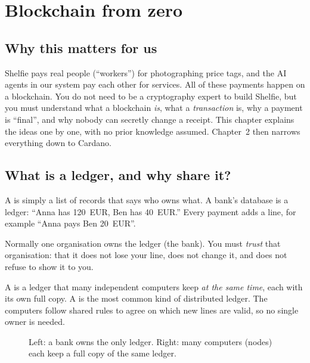 \chapter{Blockchain from zero}

\section*{Why this matters for us}
Shelfie pays real people (``workers'') for photographing price tags, and the AI agents in our system pay each other for services. All of these payments happen on a blockchain. You do not need to be a cryptography expert to build Shelfie, but you must understand what a blockchain \emph{is}, what a \emph{transaction} is, why a payment is ``final'', and why nobody can secretly change a receipt. This chapter explains the ideas one by one, with no prior knowledge assumed. Chapter~2 then narrows everything down to Cardano.

\section{What is a ledger, and why share it?}

A  is simply a list of records that says who owns what. A bank's database is a ledger: ``Anna has 120~EUR, Ben has 40~EUR.'' Every payment adds a line, for example ``Anna pays Ben 20~EUR''.

Normally one organisation owns the ledger (the bank). You must \emph{trust} that organisation: that it does not lose your line, does not change it, and does not refuse to show it to you.

A  is a ledger that many independent computers keep \emph{at the same time}, each with its own full copy. A  is the most common kind of distributed ledger. The computers follow shared rules to agree on which new lines are valid, so no single owner is needed.

\begin{figure}[h]
\centering
{}
\caption{Left: a bank owns the only ledger. Right: many computers (nodes) each keep a full copy of the same ledger.}
\end{figure}

